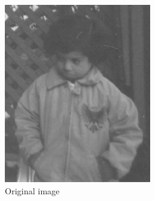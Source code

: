 \documentclass[12pt]{article}
\begin{document}
\begin{figure}[H]
  \centering
  \begin{subfigure}{.45\textwidth}
    \includegraphics[width=\linewidth]{./img/in.jpg}
    \caption{Original image}
  \end{subfigure}
  \hspace{1cm}
  \begin{subfigure}{.45\textwidth}

\end{subfigure}
\end{figure}
\end{document}
